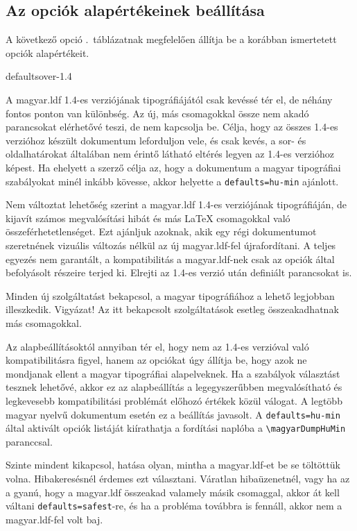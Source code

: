 \documentclass[12pt]{article}
\begin{document}
\subsection{Az opciók alapértékeinek beállítása}\label{subsec-defaults}

A következő opció .~táblázatnak megfelelően állítja be a korábban ismertetett opciók alapértékeit.

\begin{description}

\begin{hunopt}{defaults}{over-1.4}
\item[over-1.4]
A \textsf{magyar.ldf} 1.4-es verziójának tipográfiájától csak kevéssé tér el, de néhány fontos ponton van különbség.
Az új, más csomagokkal össze nem akadó parancsokat elérhetővé teszi, de nem kapcsolja be.
Célja, hogy az összes 1.4-es verzióhoz készült dokumentum leforduljon vele, és csak kevés, a sor- és oldalhatárokat általában nem érintő látható eltérés legyen az 1.4-es verzióhoz képest.
Ha ehelyett a szerző célja az, hogy a dokumentum a magyar tipográfiai szabályokat minél inkább kövesse, akkor helyette a \texttt{defaults=hu-min} ajánlott.
\item[compat-1.4]
Nem változtat lehetőség szerint a \textsf{magyar.ldf} 1.4-es verziójának tipográfiáján, de kijavít számos megvalósítási hibát és más \LaTeX{} csomagokkal való összeférhetetlenséget.
Ezt ajánljuk azoknak, akik egy régi dokumentumot szeretnének vizuális változás nélkül az új \textsf{magyar.ldf}-fel újrafordítani. 
A teljes egyezés nem garantált, a kompatibilitás a \textsf{magyar.ldf}-nek csak az opciók által befolyásolt részeire terjed ki.
Elrejti az 1.4-es verzió után definiált parancsokat is.
\item[prettiest]
Minden új szolgáltatást bekapcsol, a magyar tipográfiához a lehető legjobban illeszkedik.
Vigyázat!
Az itt bekapcsolt szolgáltatások esetleg összeakadhatnak más csomagokkal.
\item[hu-min]
Az alapbeállításoktól annyiban tér el, hogy nem az 1.4-es verzióval való kompatibilitásra figyel, hanem az opciókat úgy állítja be, hogy azok ne mondjanak ellent a magyar tipográfiai alapelveknek.
Ha a szabályok választást tesznek lehetővé, akkor ez az alapbeállítás a legegyszerűbben megvalósítható és legkevesebb kompatibilitási problémát előhozó értékek közül válogat.
A legtöbb magyar nyelvű dokumentum esetén ez a beállítás javasolt.
A \texttt{defaults=hu-min} által aktivált opciók listáját kiírathatja a fordítási naplóba a \verb|\magyarDumpHuMin| paranccsal.
\item[safest]
Szinte mindent kikapcsol, hatása olyan, mintha a \textsf{magyar.ldf}-et be se töltöttük volna.
Hibakeresésnél érdemes ezt választani.
Váratlan hibaüzenetnél, vagy ha az a gyanú, hogy a \textsf{magyar.ldf} összeakad valamely másik csomaggal, akkor át kell váltani \texttt{defaults=safest}-re, és ha a probléma továbbra is fennáll, akkor nem a \textsf{magyar.ldf}-fel volt baj.
\end{hunopt}


\end{description}
\end{document}
